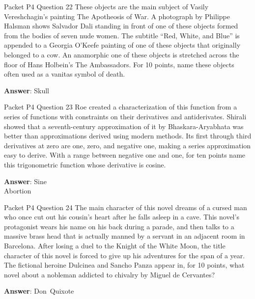 \begin{frame}{Packet P4 Question 22}
These objects are the main subject of Vasily Vereshchagin’s painting   The Apotheosis of War. A photograph by Philippe Halsman shows Salvador Dali standing in front of one of these objects formed from the bodies of seven nude women. The subtitle “Red, White, and Blue” is appended to a Georgia O’Keefe painting of one of these objects that originally belonged to a cow. An anamorphic one of these objects is stretched across the floor of Hans Holbein’s The Ambassadors. For 10 points,     name these objects often used as a vanitas   symbol of death.

\textbf{Answer}: Skull\\
\end{frame}

\begin{frame}{Packet P4 Question 23}
Roe created a characterization   of this function from a series of functions with constraints   on their derivatives and antiderivates.  Shirali showed that a seventh-century approximation of it by Bhaskara-Aryabhata was better than approximations derived using modern methods.  Its first through third derivatives at zero are one, zero, and negative one, making a series approximation easy to derive.  With a range between negative one and one, for ten points name this trigonometric function   whose derivative   is cosine.

\textbf{Answer}: Sine\\
 Abortion
\end{frame}

\begin{frame}{Packet P4 Question 24}
The main character of this novel dreams of a cursed man who once cut out his cousin's heart after he falls asleep in a cave. This novel's protagonist wears his name on his back during a parade, and then talks to a massive brass head that is actually manned by a servant in an adjacent room in Barcelona. After losing a duel to the Knight of the White Moon, the title   character of this novel is forced to give up his adventures for the span of a year. The fictional heroine Dulcinea       and Sancho Panza appear in, for 10 points, what novel about a nobleman addicted to chivalry by Miguel de Cervantes?

\textbf{Answer}: Don\ Quixote\\
\end{frame}

